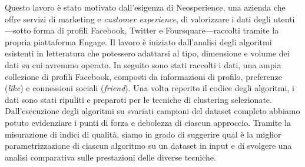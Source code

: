 Questo lavoro \`e stato motivato dall'esigenza di Neosperience, una azienda che offre servizi di marketing e \textit{customer experience}, di valorizzare i dati degli utenti---sotto forma di profili Facebook, Twitter e Foursquare---raccolti tramite la propria piattaforma Engage. Il lavoro \`e iniziato dall'analisi degli algoritmi esistenti in letteratura che potessero adattarsi al tipo, dimensione e volume dei dati su cui avremmo operato. In seguito sono stati raccolti i dati, una ampia collezione di profili Facebook, composti da informazioni di profilo, preferenze (\textit{like}) e connessioni sociali (\textit{friend}). Una volta reperito il codice degli algoritmi, i dati sono stati ripuliti e preparati per le tecniche di clustering selezionate. Dall'esecuzione degli algoritmi su svariati campioni del dataset completo abbiamo potuto evidenziare i punti di forza e debolezza di ciascun approccio. Tramite la misurazione di indici di qualit\`a, siamo in grado di suggerire qual \`e la miglior parametrizzazione di ciascun algoritmo su un dataset in input e di svolgere una analisi comparativa sulle prestazioni delle diverse tecniche.

